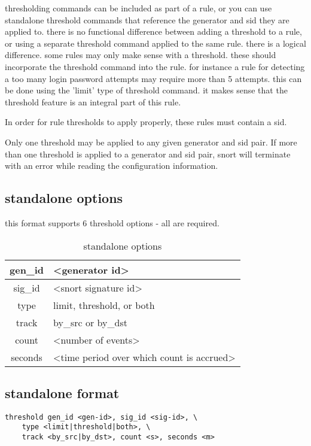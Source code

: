 \documentclass[english]{report}
\begin{document}
thresholding commands can be included as part of a rule, or you can use
standalone threshold commands that reference the generator and sid they are
applied to. there is no functional difference between adding a threshold to a
rule, or using a separate threshold command applied to the same rule.   there
is a logical difference.  some rules may only make sense with a threshold.
these should incorporate the threshold command into the rule.  for instance a
rule for detecting a too many login password attempts may require more than 5
attempts.  this can be done using the 'limit' type of threshold command.  it
makes sense that the threshold feature is an integral part of this rule.

In order for rule thresholds to apply properly, these rules must contain a
sid.

Only one threshold may be applied to any given generator and sid pair.  If more
than one threshold is applied to a generator and sid pair, snort will terminate
with an error while reading the configuration information.
                 
\subsection{standalone options}

this format supports 6 threshold options - all are required.

\begin{table}[!hbpt]
\caption{standalone options}
\begin{center}\begin{tabular}{|c|p{3.5in}|}
\hline
gen\_id & <generator id>\\
\hline
sig\_id & <snort signature id> \\
\hline
type & limit, threshold, or both \\
\hline
track & by\_src or by\_dst \\
\hline
count & <number of events> \\
\hline
seconds & <time period over which count is accrued> \\
\hline
\end{tabular}\end{center}
\end{table}

\subsection{standalone format}
\begin{verbatim}
threshold gen_id <gen-id>, sig_id <sig-id>, \
    type <limit|threshold|both>, \
    track <by_src|by_dst>, count <s>, seconds <m>  
\end{verbatim}
\end{document}

